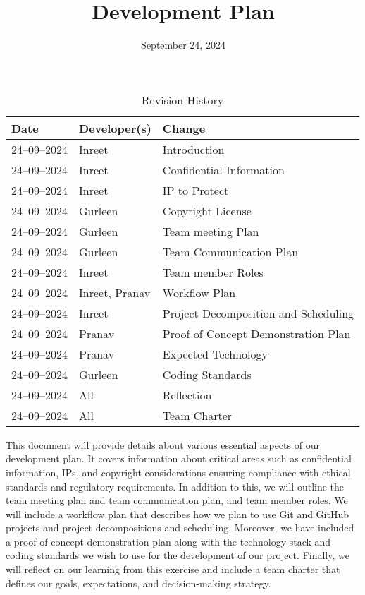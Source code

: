 \documentclass{article}
\title{Development Plan\\\progname}
\author{\authname}
\date{September 24, 2024}
\begin{document}
\maketitle

\begin{table}[hp]
\caption{Revision History} \label{TblRevisionHistory}
\begin{tabularx}{\textwidth}{llX}
\toprule
\textbf{Date} & \textbf{Developer(s)} & \textbf{Change}\\
\midrule
24--09--2024 & Inreet & Introduction\\
24--09--2024 & Inreet & Confidential Information\\
24--09--2024 & Inreet & IP to Protect\\
24--09--2024 & Gurleen & Copyright License\\
24--09--2024 & Gurleen & Team meeting Plan\\
24--09--2024 & Gurleen & Team Communication Plan\\
24--09--2024 & Inreet & Team member Roles\\
24--09--2024 & Inreet, Pranav & Workflow Plan\\
24--09--2024 & Inreet & Project Decomposition and Scheduling\\
24--09--2024 & Pranav & Proof of Concept Demonstration Plan\\
24--09--2024 & Pranav & Expected Technology\\
24--09--2024 & Gurleen & Coding Standards\\
24--09--2024 & All & Reflection\\
24--09--2024 & All & Team Charter\\
\bottomrule
\end{tabularx}
\end{table}

\newpage{}

This document will provide details about various essential aspects of our development plan. It covers information about critical areas such as confidential information, IPs, and copyright considerations ensuring compliance with ethical standards and regulatory requirements. In addition to this, we will outline the team meeting plan and team communication plan, and team member roles. We will include a workflow plan that describes how we plan to use Git and GitHub projects and project decompositions and scheduling. Moreover, we have included a proof-of-concept demonstration plan along with the technology stack and coding standards we wish to use for the development of our project. Finally, we will reflect on our learning from this exercise and include a team charter that defines our goals, expectations, and decision-making strategy.
\end{document}
